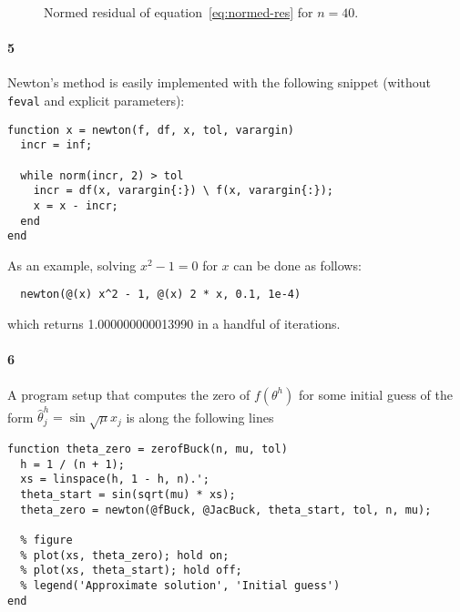 \documentclass[a4paper]{article}
\begin{document}
  \begin{figure}[b]
    \caption{Normed residual of equation~\eqref{eq:normed-res} for $n = 40.$ }
    \label{fig:normed-res}
    
  \end{figure}

  \paragraph{5} Newton's method is easily implemented with the following snippet (without {\tt feval} and explicit parameters):
\begin{lstlisting}
function x = newton(f, df, x, tol, varargin)
  incr = inf;

  while norm(incr, 2) > tol
    incr = df(x, varargin{:}) \ f(x, varargin{:});
    x = x - incr;
  end
end
\end{lstlisting}
  As an example, solving $x^2 -1 = 0$ for $x$ can be done as follows:
\begin{lstlisting}
  newton(@(x) x^2 - 1, @(x) 2 * x, 0.1, 1e-4)
\end{lstlisting}
  which returns {\rm 1.000000000013990} in a handful of iterations.
  \paragraph{6} A program setup that computes the zero of $f(\theta^h)$ for some initial guess of the form $\hat{\theta}^h_j = \sin \sqrt{\mu} x_j$ is along the following lines
\begin{lstlisting}
function theta_zero = zerofBuck(n, mu, tol)
  h = 1 / (n + 1);
  xs = linspace(h, 1 - h, n).';
  theta_start = sin(sqrt(mu) * xs);
  theta_zero = newton(@fBuck, @JacBuck, theta_start, tol, n, mu);

  % figure
  % plot(xs, theta_zero); hold on;
  % plot(xs, theta_start); hold off;
  % legend('Approximate solution', 'Initial guess')
end
\end{lstlisting}
\end{document}

